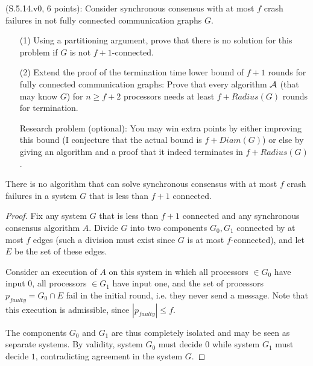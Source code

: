 

\begin{Exc}{(S.5.14.v0, 6 points):}
Consider synchronous consensus with at most $f$ crash failures in not
fully connected communication graphs $G$.
\begin{enumerate}
\item[(1)] Using a partitioning argument, prove that there is no solution for this problem if $G$
is not $f+1$-connected.
\item[(2)] Extend the proof of the termination time lower bound of $f+1$ rounds
for fully connected communication graphs: Prove that every algorithm ${\cal A}$
(that may know $G$) for $n\geq f+2$ processors needs at least $f+Radius(G)$ rounds
for termination.

Research problem (optional): You may win extra points by either improving this
bound (I conjecture that the actual bound is $f+Diam(G)$) or else
by giving an algorithm and a proof that it indeed terminates in
$f+Radius(G)$.
\end{enumerate}
\end{Exc}

\begin{theorem}
There is no algorithm that can solve synchronous consensus with at most $f$
crash failures in a system $G$ that is less than $f+1$ connected.
\end{theorem}

\begin{proof}
Fix any system $G$ that is less than $f+1$ connected and any synchronous consensus
algorithm $A$. Divide $G$ into two components $G_0, G_1$ connected by at most $f$
edges (such a division must exist since $G$ is at most $f$-connected), and let
$E$ be the set of these edges.

Consider an execution of $A$ on this system in which all processors $\in G_0$
have input $0$, all processors $\in G_1$ have input one, and the set of processors
$p_{faulty} = G_0 \cap E$ fail in the initial round, i.e. they never send
a message. Note that this execution is admissible, since $|p_{faulty}| \leq f$.

The components $G_0$ and $G_1$ are thus completely isolated and may be seen as
separate systems. By validity, system $G_0$ must decide $0$ while system $G_1$
must decide $1$, contradicting agreement in the system $G$.
\end{proof}


